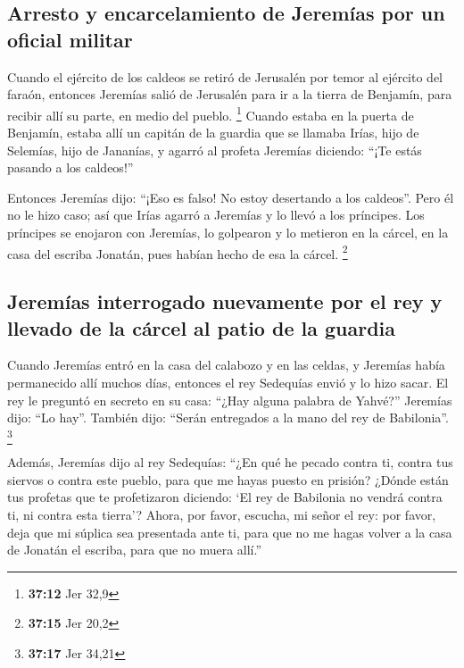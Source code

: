 \hypertarget{arresto-y-encarcelamiento-de-jeremuxedas-por-un-oficial-militar}{%
\subsection{Arresto y encarcelamiento de Jeremías por un oficial
militar}\label{arresto-y-encarcelamiento-de-jeremuxedas-por-un-oficial-militar}}

 Cuando el ejército de los caldeos se retiró de Jerusalén
por temor al ejército del faraón,  entonces Jeremías
salió de Jerusalén para ir a la tierra de Benjamín, para recibir allí su
parte, en medio del pueblo. \footnote{\textbf{37:12} Jer 32,9}
 Cuando estaba en la puerta de Benjamín, estaba allí un
capitán de la guardia que se llamaba Irías, hijo de Selemías, hijo de
Jananías, y agarró al profeta Jeremías diciendo: ``¡Te estás pasando a
los caldeos!''

 Entonces Jeremías dijo: ``¡Eso es falso! No estoy
desertando a los caldeos''. Pero él no le hizo caso; así que Irías
agarró a Jeremías y lo llevó a los príncipes.  Los
príncipes se enojaron con Jeremías, lo golpearon y lo metieron en la
cárcel, en la casa del escriba Jonatán, pues habían hecho de esa la
cárcel. \footnote{\textbf{37:15} Jer 20,2}

\hypertarget{jeremuxedas-interrogado-nuevamente-por-el-rey-y-llevado-de-la-cuxe1rcel-al-patio-de-la-guardia}{%
\subsection{Jeremías interrogado nuevamente por el rey y llevado de la
cárcel al patio de la
guardia}\label{jeremuxedas-interrogado-nuevamente-por-el-rey-y-llevado-de-la-cuxe1rcel-al-patio-de-la-guardia}}

 Cuando Jeremías entró en la casa del calabozo y en las
celdas, y Jeremías había permanecido allí muchos días, 
entonces el rey Sedequías envió y lo hizo sacar. El rey le preguntó en
secreto en su casa: ``¿Hay alguna palabra de Yahvé?'' Jeremías dijo:
``Lo hay''. También dijo: ``Serán entregados a la mano del rey de
Babilonia''. \footnote{\textbf{37:17} Jer 34,21}

 Además, Jeremías dijo al rey Sedequías: ``¿En qué he
pecado contra ti, contra tus siervos o contra este pueblo, para que me
hayas puesto en prisión?  ¿Dónde están tus profetas que
te profetizaron diciendo: `El rey de Babilonia no vendrá contra ti, ni
contra esta tierra'?  Ahora, por favor, escucha, mi señor
el rey: por favor, deja que mi súplica sea presentada ante ti, para que
no me hagas volver a la casa de Jonatán el escriba, para que no muera
allí.''

